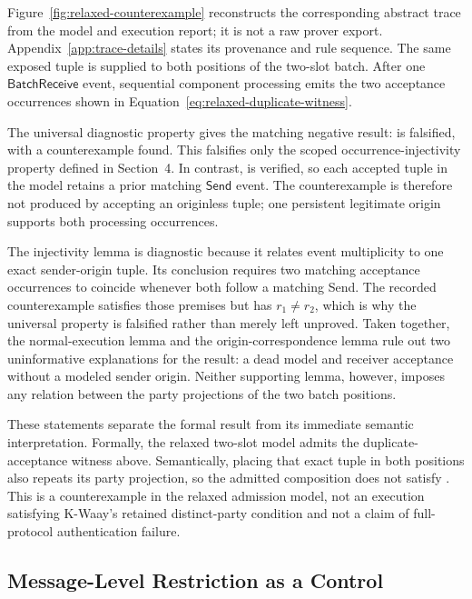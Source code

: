 Figure~\ref{fig:relaxed-counterexample} reconstructs the corresponding abstract
trace from the model and execution report; it is not a raw prover export.
Appendix~\ref{app:trace-details} states its provenance and rule sequence.
The same exposed tuple is supplied to both positions of the two-slot
batch. After one \(\mathsf{BatchReceive}\) event, sequential component
processing emits the two acceptance occurrences shown in
Equation~\eqref{eq:relaxed-duplicate-witness}.



The universal diagnostic property gives the matching negative result:
 is falsified, with a counterexample found.
This falsifies only the scoped occurrence-injectivity property
defined in Section~4. In contrast,
 is verified, so each accepted
tuple in the model retains a prior matching \(\mathsf{Send}\) event. The
counterexample is therefore not produced by accepting an originless tuple;
one persistent legitimate origin supports both processing occurrences.

The injectivity lemma is diagnostic because it relates event multiplicity to
one exact sender-origin tuple. Its conclusion requires two matching acceptance
occurrences to coincide whenever both follow a matching Send. The recorded
counterexample satisfies those premises but has $r_1\neq r_2$, which is why
the universal property is falsified rather than merely left unproved. Taken
together, the normal-execution lemma and the origin-correspondence lemma rule
out two uninformative explanations for the result: a dead model and receiver
acceptance without a modeled sender origin. Neither supporting lemma, however,
imposes any relation between the party projections of the two batch positions.

These statements separate the formal result from its immediate semantic
interpretation. Formally, the relaxed two-slot model admits the duplicate-
acceptance witness above. Semantically, placing that exact tuple in both
positions also repeats its party projection, so the admitted composition does
not satisfy \distinctparty. This is a counterexample in the relaxed admission
model, not an execution satisfying K-Waay's retained distinct-party condition
and not a claim of full-protocol authentication failure.

\subsection{Message-Level Restriction as a Control}

